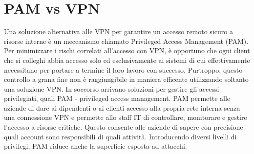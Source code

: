 \section{PAM vs VPN}
Una soluzione alternativa alle VPN per garantire un accesso remoto sicuro a risorse interne è un meccanismo chiamato Privileged Access Management (PAM).
Per minimizzare i rischi correlati all'accesso con VPN, è opportuno che ogni client che si colleghi abbia accesso solo ed esclusivamente ai sistemi di cui effettivamente necessitano per portare a termine il loro lavoro con successo.
Purtroppo, questo controllo a grana fine non è raggiungibile in maniera efficente utilizzando soltanto una soluzione VPN. In soccorso arrivano soluzioni per gestire gli accessi privilegiati, quali PAM - privileged access management.
PAM permette alle aziende di dare ai dipendenti o ai clienti accesso alla propria rete interna senza una connessione VPN e permette allo staff IT di controllare, monitorare e gestire l'accesso a risorse critiche. Questo consente alle aziende di sapere con precisione quali account sono responsibili di quali attività.
Introducendo diversi livelli di privilegi, PAM riduce anche la superficie esposta ad attacchi.

